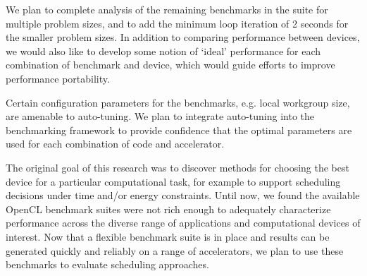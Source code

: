 \documentclass[../document.tex]{subfiles}
\begin{document}
\label{sec:future_work}

We plan to complete analysis of the remaining benchmarks in the suite for multiple problem sizes, and to add the minimum loop iteration of 2 seconds for the smaller problem sizes.
In addition to comparing performance between devices, we would also like to develop some notion of `ideal' performance for each combination of benchmark and device, which would guide efforts to improve performance portability.

Certain configuration parameters for the benchmarks, e.g. local workgroup size, are amenable to auto-tuning.
We plan to integrate auto-tuning into the benchmarking framework to provide confidence that the optimal parameters are used for each combination of code and accelerator.

The original goal of this research was to discover methods for choosing the best device for a particular computational task, for example to support scheduling decisions under time and/or energy constraints.
Until now, we found the available OpenCL benchmark suites were not rich enough to adequately characterize performance across the diverse range of applications and computational devices of interest.
Now that a flexible benchmark suite is in place and results can be generated quickly and reliably on a range of accelerators, we plan to use these benchmarks to evaluate scheduling approaches.
\end{document}
